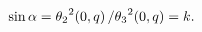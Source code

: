 \[\mathop{\sin\/}\nolimits\alpha={\mathop{\theta_{2}\/}\nolimits^{2}}\!\left(0,q%
\right)/{\mathop{\theta_{3}\/}\nolimits^{2}}\!\left(0,q\right)=k.\]